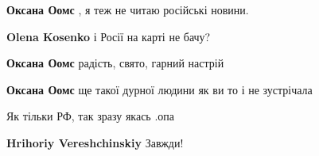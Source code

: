 \begin{itemize}
\begin{itemize}
\textbf{Оксана Оомс} , я теж не читаю російські новини.

\begin{itemize}
 
\textbf{Olena Kosenko} і Росії на карті не бачу?
\end{itemize}

 
\textbf{Оксана Оомс} радість, свято, гарний настрій

 
\textbf{Оксана Оомс} ще такої дурної людини як ви то і не зустрічала

\end{itemize}

 
Як тільки РФ, так зразу якась .опа

\begin{itemize}
 
\textbf{Hrihoriy Vereshchinskiy} Завжди!

\begin{itemize}
 

\end{itemize}
\end{itemize}
\end{itemize}
